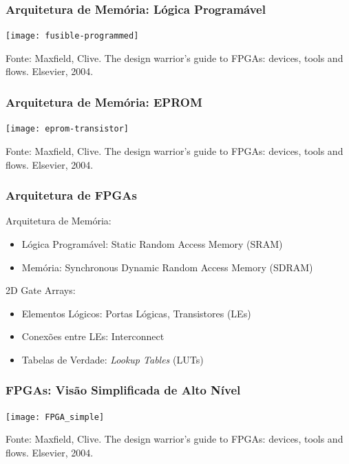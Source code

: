 \documentclass[10pt, compress]{beamer}
\begin{document}
\begin{frame}
    \frametitle{Arquitetura de Memória: Lógica Programável}
    \begin{center}
        \texttt{[image: fusible-programmed]}
    \end{center}

    \vfill

    \begin{center}
        \scriptsize{Fonte: Maxfield, Clive. The design warrior's guide to FPGAs: devices, tools and flows. Elsevier, 2004.}
    \end{center}
\end{frame}

\begin{frame}
    \frametitle{Arquitetura de Memória: EPROM}
    \begin{center}
        \texttt{[image: eprom-transistor]}
    \end{center}

    \vfill

    \begin{center}
        \scriptsize{Fonte: Maxfield, Clive. The design warrior's guide to FPGAs: devices, tools and flows. Elsevier, 2004.}
    \end{center}
\end{frame}

\begin{frame}
    \frametitle{Arquitetura de FPGAs}
    Arquitetura de Memória:
    \begin{itemize}
        \item Lógica Programável: Static Random Access Memory (\alert{SRAM})
        \item Memória: Synchronous Dynamic Random Access Memory (\alert{SDRAM})
    \end{itemize}

    \pause
    \alert{2D Gate Arrays}:

    \begin{itemize}
        \item Elementos Lógicos: Portas Lógicas, Transistores (\alert{LEs})
        \item Conexões entre LEs: \alert{Interconnect}
        \item Tabelas de Verdade: \textit{Lookup Tables} (\alert{LUTs})
    \end{itemize}
\end{frame}

\begin{frame}[fragile]
    \frametitle{FPGAs: Visão Simplificada de Alto Nível}
    \begin{center}
        \texttt{[image: FPGA\_simple]}
    \end{center}

    \vfill

    \begin{center}
        \scriptsize{Fonte: Maxfield, Clive. The design warrior's guide to FPGAs: devices, tools and flows. Elsevier, 2004.}
    \end{center}
\end{frame}
\end{document}
